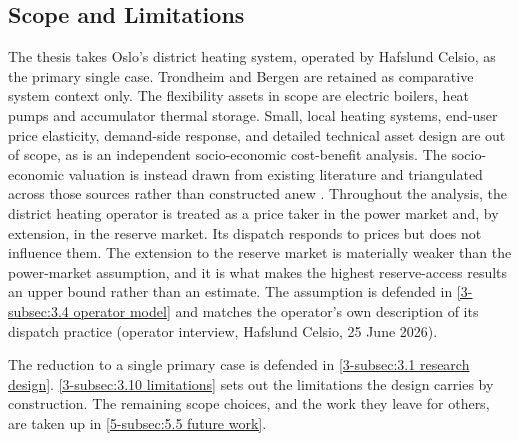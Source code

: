 \subsection{Scope and Limitations}
\label{1-subsec:1.4 scope and limitations}
The thesis takes Oslo's district heating system, operated by Hafslund Celsio, as the primary single case. Trondheim and Bergen are retained as comparative system context only. The flexibility assets in scope are electric boilers, heat pumps and accumulator thermal storage. Small, local heating systems, end-user price elasticity, demand-side response, and detailed technical asset design are out of scope, as is an independent socio-economic cost-benefit analysis. The socio-economic valuation is instead drawn from existing literature and triangulated across those sources rather than constructed anew \cite{ahmed_district_2025}. Throughout the analysis, the district heating operator is treated as a price taker in the power market and, by extension, in the reserve market. Its dispatch responds to prices but does not influence them. The extension to the reserve market is materially weaker than the power-market assumption, and it is what makes the highest reserve-access results an upper bound rather than an estimate. The assumption is defended in \autoref{3-subsec:3.4 operator model} and matches the operator's own description of its dispatch practice (operator interview, Hafslund Celsio, 25 June 2026).

The reduction to a single primary case is defended in \autoref{3-subsec:3.1 research design}. \autoref{3-subsec:3.10 limitations} sets out the limitations the design carries by construction. The remaining scope choices, and the work they leave for others, are taken up in \autoref{5-subsec:5.5 future work}.

